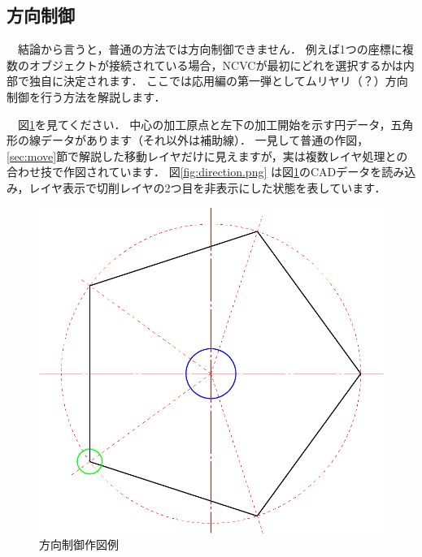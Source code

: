 

\subsection{方向制御}
　結論から言うと，普通の方法では方向制御できません．
例えば1つの座標に複数のオブジェクトが接続されている場合，NCVCが最初にどれを選択するかは内部で独自に決定されます．
ここでは応用編の第一弾としてムリヤリ（？）方向制御を行う方法を解説します．

\begin{minipage}[t]{0.5\textwidth}
　図\ref{fig:direction}を見てください．
中心の加工原点と左下の加工開始を示す円データ，五角形の線データがあります（それ以外は補助線）．
一見して普通の作図，\ref{sec:move}節で解説した移動レイヤだけに見えますが，実は複数レイヤ処理との合わせ技で作図されています．
図\ref{fig:direction.png} は図\ref{fig:direction}のCADデータを読み込み，レイヤ表示で切削レイヤの2つ目を非表示にした状態を表しています．
\end{minipage}
\begin{minipage}[t]{0.5\textwidth}
\vspace*{-2zh}
\begin{figure}[H]
\centering
\includegraphics[width=\textwidth]{No4/fig/direction-crop.pdf}
\caption{方向制御作図例}
\label{fig:direction}
\end{figure}
\end{minipage}

